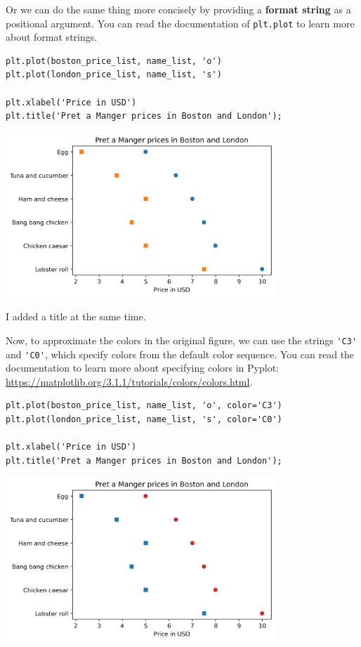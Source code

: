 Or we can do the same thing more concisely by providing a \textbf{format
string} as a positional argument. You can read the documentation of
\passthrough{\lstinline!plt.plot!} to learn more about format strings.

\begin{lstlisting}[]
plt.plot(boston_price_list, name_list, 'o')
plt.plot(london_price_list, name_list, 's')

plt.xlabel('Price in USD')
plt.title('Pret a Manger prices in Boston and London');
\end{lstlisting}

\begin{center}
\includegraphics[width=4in]{chapters/06_plotting_files/06_plotting_43_0.png}
\end{center}

I added a title at the same time.

Now, to approximate the colors in the original figure, we can use the
strings \passthrough{\lstinline!'C3'!} and
\passthrough{\lstinline!'C0'!}, which specify colors from the default
color sequence. You can read the documentation to learn more about
specifying colors in Pyplot:
\url{https://matplotlib.org/3.1.1/tutorials/colors/colors.html}.

\begin{lstlisting}[]
plt.plot(boston_price_list, name_list, 'o', color='C3')
plt.plot(london_price_list, name_list, 's', color='C0')

plt.xlabel('Price in USD')
plt.title('Pret a Manger prices in Boston and London');
\end{lstlisting}

\begin{center}
\includegraphics[width=4in]{chapters/06_plotting_files/06_plotting_45_0.png}
\end{center}

